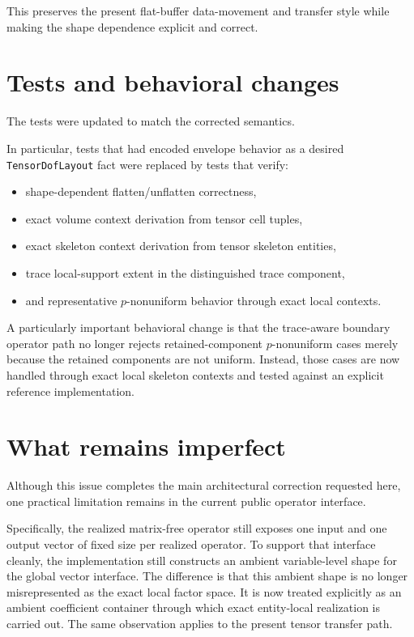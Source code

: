 \documentclass[11pt]{article}
\begin{document}
This preserves the present flat-buffer data-movement and transfer style while making the shape dependence explicit and correct.

\section{Tests and behavioral changes}

The tests were updated to match the corrected semantics.

In particular, tests that had encoded envelope behavior as a desired \texttt{TensorDofLayout} fact were replaced by tests that verify:
\begin{itemize}[leftmargin=*]
  \item shape-dependent flatten/unflatten correctness,
  \item exact volume context derivation from tensor cell tuples,
  \item exact skeleton context derivation from tensor skeleton entities,
  \item trace local-support extent in the distinguished trace component,
  \item and representative \(p\)-nonuniform behavior through exact local contexts.
\end{itemize}

A particularly important behavioral change is that the trace-aware boundary operator path no longer rejects retained-component \(p\)-nonuniform cases merely because the retained components are not uniform.  Instead, those cases are now handled through exact local skeleton contexts and tested against an explicit reference implementation.

\section{What remains imperfect}

Although this issue completes the main architectural correction requested here, one practical limitation remains in the current public operator interface.

Specifically, the realized matrix-free operator still exposes one input and one output vector of fixed size per realized operator.  To support that interface cleanly, the implementation still constructs an ambient variable-level shape for the global vector interface.  The difference is that this ambient shape is no longer misrepresented as the exact local factor space.  It is now treated explicitly as an ambient coefficient container through which exact entity-local realization is carried out.  The same observation applies to the present tensor transfer path.
\end{document}
